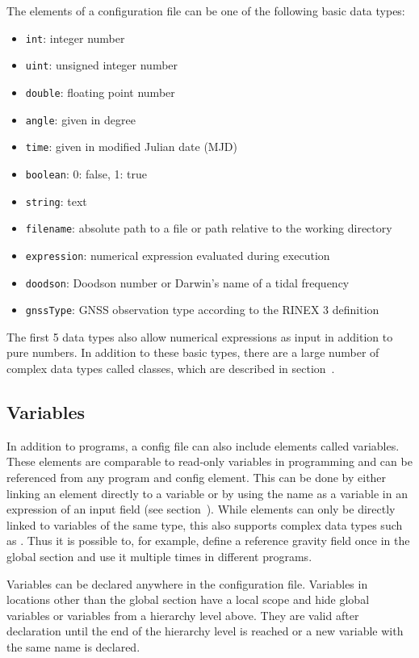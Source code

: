 The elements of a configuration file can be one of the following basic data types:
\begin{itemize}
\item \verb|int|: integer number
\item \verb|uint|: unsigned integer number
\item \verb|double|: floating point number
\item \verb|angle|: given in degree
\item \verb|time|: given in modified Julian date (MJD)
\item \verb|boolean|: 0: false, 1: true
\item \verb|string|: text
\item \verb|filename|: absolute path to a file or path relative to the working directory
\item \verb|expression|: numerical expression evaluated during execution
\item \verb|doodson|: Doodson number or Darwin's name of a tidal frequency
\item \verb|gnssType|: GNSS observation type according to the RINEX 3 definition
\end{itemize}
The first 5 data types also allow numerical expressions as input in addition to pure numbers.
In addition to these basic types, there are a large number of complex data types called classes,
which are described in section~.

\subsection{Variables}\label{general.configFiles:variables}
In addition to programs, a config file can also include elements called variables.
These elements are comparable to read-only variables in programming and can be referenced from any program and config element.
This can be done by either linking an element directly to a variable or
by using the name as a variable in an expression of an input field (see section~).
While elements can only be directly linked to variables of the same type, this also supports complex data types
such as . Thus it is possible to, for example, define a reference gravity field once
in the global section and use it multiple times in different programs.

Variables can be declared anywhere in the configuration file. Variables in locations other than the global section
have a local scope and hide global variables or variables from a hierarchy level above. They are valid after
declaration until the end of the hierarchy level is reached or a new variable with the same name is declared.

